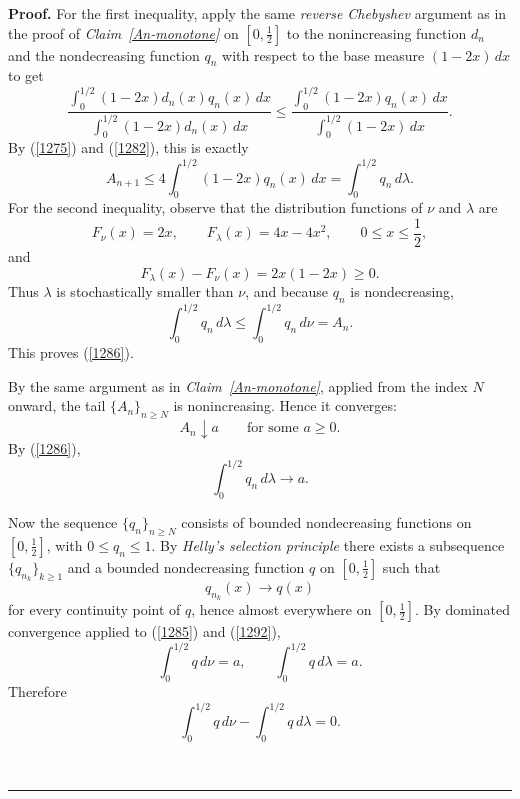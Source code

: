 \documentclass[onecolumn]{article}
\newenvironment{proof}[1][Proof]{\noindent\textbf{#1.} }{\ \rule{0.5em}{0.5em}}
\begin{document}
\begin{proof}
For the first inequality, apply the same \textit{reverse Chebyshev} argument
as in the proof of \textit{Claim~\ref{An-monotone}} on $[0,\tfrac{1}{2}]$ to
the nonincreasing function $d_{n}$ and the nondecreasing function $q_{n}$
with respect to the base measure $(1-2x)\,dx$ to get 
\begin{equation}
\frac{\int_{0}^{1/2}(1-2x)d_{n}(x)q_{n}(x)\,dx}{\int_{0}^{1/2}(1-2x)d_{n}(x)%
\,dx}\leq \frac{\int_{0}^{1/2}(1-2x)q_{n}(x)\,dx}{\int_{0}^{1/2}(1-2x)\,dx}.
\label{1287}
\end{equation}%
By (\ref{1275}) and (\ref{1282}), this is exactly 
\begin{equation}
A_{n+1}\leq 4\int_{0}^{1/2}(1-2x)q_{n}(x)\,dx=\int_{0}^{1/2}q_{n}\,d\lambda .
\label{1288}
\end{equation}%
For the second inequality, observe that the distribution functions of $\nu $
and $\lambda $ are 
\begin{equation}
F_{\nu }(x)=2x,\qquad F_{\lambda }(x)=4x-4x^{2},\qquad 0\leq x\leq \frac{1}{2%
},  \label{1289}
\end{equation}%
and 
\begin{equation}
F_{\lambda }(x)-F_{\nu }(x)=2x(1-2x)\geq 0.  \label{1290}
\end{equation}%
Thus $\lambda $ is stochastically smaller than $\nu $, and because $q_{n}$
is nondecreasing, 
\begin{equation}
\int_{0}^{1/2}q_{n}\,d\lambda \leq \int_{0}^{1/2}q_{n}\,d\nu =A_{n}.
\label{1291}
\end{equation}%
This proves (\ref{1286}).

By the same argument as in \textit{Claim~\ref{An-monotone}}, applied from
the index $N$ onward, the tail $\{A_{n}\}_{n\geq N}$ is nonincreasing. Hence
it converges: 
\begin{equation*}
A_{n}\downarrow a\qquad \text{for some }a\geq 0.
\end{equation*}%
By (\ref{1286}), 
\begin{equation}
\int_{0}^{1/2}q_{n}\,d\lambda \longrightarrow a.  \label{1292}
\end{equation}

Now the sequence $\{q_{n}\}_{n\geq N}$ consists of bounded nondecreasing
functions on $[0,\tfrac{1}{2}]$, with $0\leq q_{n}\leq 1$. By \textit{%
Helly's selection principle }there exists a subsequence $\{q_{n_{k}}\}_{k%
\geq 1}$ and a bounded nondecreasing function $q$ on $[0,\tfrac{1}{2}]$ such
that 
\begin{equation*}
q_{n_{k}}(x)\longrightarrow q(x)
\end{equation*}%
for every continuity point of $q$, hence almost everywhere on $[0,\tfrac{1}{2%
}]$. By dominated convergence applied to (\ref{1285}) and (\ref{1292}), 
\begin{equation}
\int_{0}^{1/2}q\,d\nu =a,\qquad \int_{0}^{1/2}q\,d\lambda =a.  \label{1293}
\end{equation}%
Therefore 
\begin{equation}
\int_{0}^{1/2}q\,d\nu -\int_{0}^{1/2}q\,d\lambda =0.  \label{1294}
\end{equation}


\end{proof}
\end{document}
